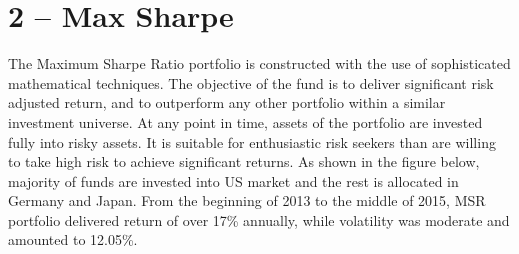 \documentclass[11pt, parskip=full, DIV=14]{scrreprt}
\begin{document}
\newpage\section*{2 -- Max Sharpe}
The Maximum Sharpe Ratio portfolio is constructed with the use of sophisticated mathematical techniques. The objective of the fund is to deliver significant risk adjusted return, and to outperform any other portfolio within a similar investment universe. 
At any point in time, assets of the portfolio are invested fully into risky assets. It is suitable for enthusiastic risk seekers than are willing to take high risk to achieve significant returns. As shown in the figure below, majority of funds are invested into US market and the rest is allocated in Germany and Japan. From the beginning of 2013 to the middle of 2015, MSR portfolio delivered return of over 17\% annually, while volatility was moderate and amounted to 12.05\%. 

\begin{figure}[H]
\end{figure}
\end{document}
